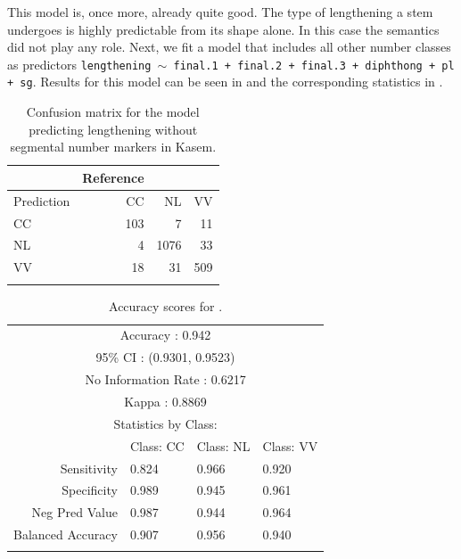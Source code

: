 This model is, once more, already quite good. The type of lengthening a stem undergoes is highly predictable from its shape alone. In this case the semantics did not play any role. Next, we fit a model that includes all other number classes as predictors \texttt{lengthening $\sim$ final.1 + final.2 + final.3 + diphthong + pl + sg}. Results for this model can be seen in  and the corresponding statistics in .

\begin{table}[!htpb]
  \centering
  \begin{tabular}{lrrr}
    \lsptoprule
               & Reference        \\
    \midrule
    Prediction & CC  & NL   & VV  \\
    CC         & 103 & 7    & 11  \\
    NL         & 4   & 1076 & 33  \\
    VV         & 18  & 31   & 509 \\
    \lspbottomrule
  \end{tabular}
    \caption{Confusion matrix for the model predicting lengthening without segmental number markers in Kasem.}
  \label{tab:length-kasem-2}
\end{table}

\begin{table}[!htpb]
  \centering
  \begin{tabular}{rlll}
    \lsptoprule
    \multicolumn{4}{c}{Overall Statistics}           \\
    \midrule
    \multicolumn{4}{c}{Accuracy : 0.942}             \\
    \multicolumn{4}{c}{95\% CI : (0.9301, 0.9523)}   \\
    \multicolumn{4}{c}{No Information Rate : 0.6217} \\
    \multicolumn{4}{c}{Kappa : 0.8869}               \\
    \midrule
    \multicolumn{4}{c}{Statistics by Class:}         \\
    \midrule

                      & Class: CC & Class: NL & Class: VV \\
    Sensitivity       & 0.824     & 0.966     & 0.920     \\
    Specificity       & 0.989     & 0.945     & 0.961     \\
    Neg Pred Value    & 0.987     & 0.944     & 0.964     \\
    Balanced Accuracy & 0.907     & 0.956     & 0.940     \\
    \lspbottomrule
  \end{tabular}
    \caption{Accuracy scores for .}\label{tab:length-kasem-2-stats}
\end{table}


